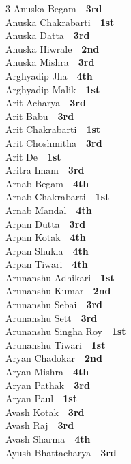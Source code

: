 \documentclass[11pt,a4paper]{article}
\begin{document}
\begin{multicols}{3}
Anuska Begam~\dotfill~\textbf{3rd}\\
Anuska Chakrabarti~\dotfill~\textbf{1st}\\
Anuska Datta~\dotfill~\textbf{3rd}\\
Anuska Hiwrale~\dotfill~\textbf{2nd}\\
Anuska Mishra~\dotfill~\textbf{3rd}\\
Arghyadip Jha~\dotfill~\textbf{4th}\\
Arghyadip Malik~\dotfill~\textbf{1st}\\
Arit Acharya~\dotfill~\textbf{3rd}\\
Arit Babu~\dotfill~\textbf{3rd}\\
Arit Chakrabarti~\dotfill~\textbf{1st}\\
Arit Choshmitha~\dotfill~\textbf{3rd}\\
Arit De~\dotfill~\textbf{1st}\\
Aritra Imam~\dotfill~\textbf{3rd}\\
Arnab Begam~\dotfill~\textbf{4th}\\
Arnab Chakrabarti~\dotfill~\textbf{1st}\\
Arnab Mandal~\dotfill~\textbf{4th}\\
Arpan Dutta~\dotfill~\textbf{3rd}\\
Arpan Kotak~\dotfill~\textbf{4th}\\
Arpan Shukla~\dotfill~\textbf{4th}\\
Arpan Tiwari~\dotfill~\textbf{4th}\\
Arunanshu Adhikari~\dotfill~\textbf{1st}\\
Arunanshu Kumar~\dotfill~\textbf{2nd}\\
Arunanshu Sebai~\dotfill~\textbf{3rd}\\
Arunanshu Sett~\dotfill~\textbf{3rd}\\
Arunanshu Singha Roy~\dotfill~\textbf{1st}\\
Arunanshu Tiwari~\dotfill~\textbf{1st}\\
Aryan Chadokar~\dotfill~\textbf{2nd}\\
Aryan Mishra~\dotfill~\textbf{4th}\\
Aryan Pathak~\dotfill~\textbf{3rd}\\
Aryan Paul~\dotfill~\textbf{1st}\\
Avash Kotak~\dotfill~\textbf{3rd}\\
Avash Raj~\dotfill~\textbf{3rd}\\
Avash Sharma~\dotfill~\textbf{4th}\\
Ayush Bhattacharya~\dotfill~\textbf{3rd}\\

\end{multicols}
\end{document}
